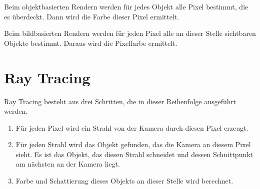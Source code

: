 Beim objektbasierten Rendern werden für jedes Objekt alle Pixel bestimmt, die es überdeckt.
Dann wird die Farbe dieser Pixel ermittelt.

Beim bildbasierten Rendern werden für jeden Pixel alle an dieser Stelle sichtbaren Objekte bestimmt.
Daraus wird die Pixelfarbe ermittelt.

\section{Ray Tracing}
Ray Tracing besteht aus drei Schritten, die in dieser Reihenfolge ausgeführt werden.
\begin{enumerate}
	\item {} Für jeden Pixel wird ein Strahl von der Kamera durch diesen Pixel erzeugt.
	\item {} Für jeden Strahl wird das Objekt gefunden, das die Kamera an diesem Pixel sieht.
	Es ist das Objekt, das diesen Strahl schneidet und dessen Schnittpunkt am nächsten an der Kamera liegt.
	\item {} Farbe und Schattierung dieses Objekts an dieser Stelle wird berechnet.
\end{enumerate}
